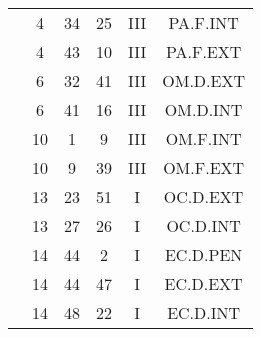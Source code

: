 \documentclass[12pt, a4paper]{article}
\begin{document}
\begin{multicols}{3}
{\begin{tabular}{c c c c c c}
	 	 	 	 & 4 & 34 & 25 & III & PA.F.INT\\%
	 	 	 	 & 4 & 43 & 10 & III & PA.F.EXT\\%
	 	 	 	 & 6 & 32 & 41 & III & OM.D.EXT\\%
	 	 	 	 & 6 & 41 & 16 & III & OM.D.INT\\%
	 	 	 	 & 10 & 1 & 9 & III & OM.F.INT\\%
	 	 	 	 & 10 & 9 & 39 & III & OM.F.EXT\\%
	 	 	 	 & 13 & 23 & 51 & I & OC.D.EXT\\%
	 	 	 	 & 13 & 27 & 26 & I & OC.D.INT\\%
	 	 	 	 & 14 & 44 & 2 & I & EC.D.PEN\\%
	 	 	 	 & 14 & 44 & 47 & I & EC.D.EXT\\%
	 	 	 	 & 14 & 48 & 22 & I & EC.D.INT\\%
	 	 \end{tabular}
 	}
\end{multicols}
\end{document}

